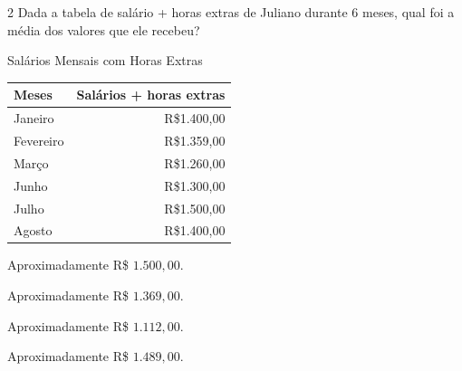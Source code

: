 


\num{2} Dada a tabela de salário + horas extras de Juliano durante 6 meses,
qual foi a média dos valores que ele recebeu?

\begin{table}[H]
  \centering
 {Salários Mensais com Horas Extras}\medskip\\
  \begin{tabular}{lr}
    \toprule
    Meses & Salários + horas extras \\
    \midrule
    Janeiro & R\$1.400,00 \\
    Fevereiro & R\$1.359,00 \\
    Março & R\$1.260,00 \\
    Junho & R\$1.300,00 \\
    Julho & R\$1.500,00 \\
    Agosto & R\$1.400,00 \\
    \bottomrule
  \end{tabular}
\end{table}

\begin{escolha}[itemsep=0pt]
\item Aproximadamente R\$ $1.500,00$.
\item Aproximadamente R\$ $1.369,00$.
\item Aproximadamente R\$ $1.112,00$.
\item Aproximadamente R\$ $1.489,00$.
\end{escolha}



